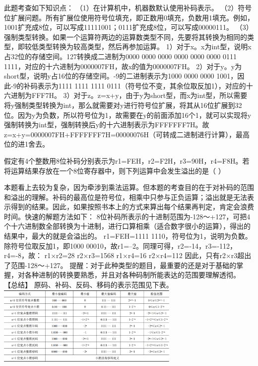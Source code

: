 \begin{solution}此题考查如下知识点： （1）在计算机中，机器数默认使用补码表示。
（2）符号位扩展问题。所有扩展位使用符号位填充，即正数用0填充，负数用1填充。例如，1001扩充成8位，可以写成11111001；0111扩充成8位，可以写成00000111。
（3）强制类型转换。如果一个运算符两边的运算数类型不同，先要将其转换为相同的类型，即较低类型转换为较高类型，然后再参加运算。
1）对于x。x为int型，说明x占32位的存储空间。127转换成二进制为0000 0000
0000 0000 0000 0000 0111
1111，对应的十六进制为0000007FH，故x的值为0000007FH。
2）对于y。y为short型，说明y占16位的存储空间。-9的二进制表示为1000 0000
0000 1001，因此-9的补码表示为1111 1111 1111
0111（符号位不变，其余位取反加1），对应的十六进制为FFF7H。
3）对于z。z=x+y，由于y为short型，而x为int型，所以需要将y强制类型转换为int，那么就需要对y进行符号位扩展，将其从16位扩展到32位。因为y为负数，所以符号位为1，故需要在y的前面添加16个1，就可以实现将y强制转换为int型，强制转换后y的十六进制表示为FFFFFFF7H。故z=x+y=0000007FH+FFFFFFF7H=00000076H（可转成二进制进行计算），最高位的进1舍去。
\end{solution}
\question 假定有4个整数用8位补码分别表示为r1=FEH，r2=F2H，r3=90H，r4=F8H。若将运算结果存放在一个8位寄存器中，则下列运算中会发生溢出的是（
）
\par{}
\begin{solution}本题看上去较为复杂，因为牵涉到乘法运算。但本题的考查目的在于对补码的范围和溢出的理解。补码的最高位是符号位，相乘中只参与正负运算；溢出就是无法表示得到的结果。因此，如果按照书本上的方式来算出每个结果再判定，肯定会浪费时间。快速的解题方法如下：
8位补码所表示的十进制范围为-128～+127，可把4个十六进制数全部转换为十进制，进行口算相乘（适合数字很小的运算），得出的结果中，最大的就是会溢出的。
r1=FEH=1111 1110，符号位为1，说明为负数。除符号位取反加1，即1000
00010，故r1=--2。同理可得，r2=-14，r3=-112，r4=-8，故： r1×r2=28
r2×r3=1568 r1×r4=16 r2×r4=112 因此，只有r2×r3超出了范围-128～+127。
提醒：对于此种类型的题目，最重要的还是对于基础的掌握，对各种进制的转换要熟悉，并且对各种码制所能表达的范围要理解透彻。
【总结】
原码、补码、反码、移码的表示范围见下表。\includegraphics[width=3.46875in,height=1.52083in]{computerassets/0DC0AD3753DD835E184D090930E7A18E.png}
\end{solution}
